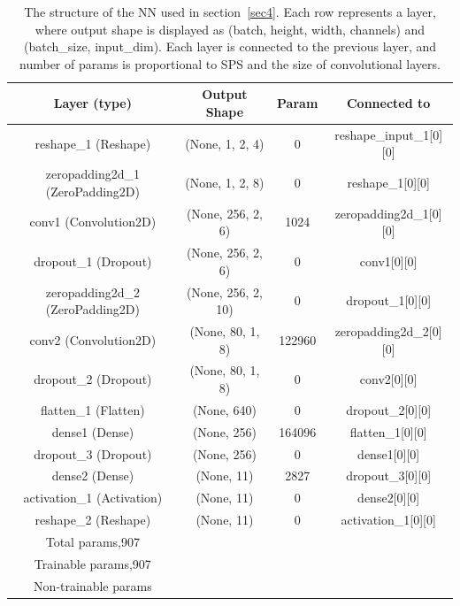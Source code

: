 \begin{table}[t!]
\centering
\caption{The structure of the NN used in section~\ref{sec4}. Each row represents a layer, where output shape is displayed as (batch, height, width, channels) and (batch\_size, input\_dim). Each layer is connected to the previous layer, and number of params is proportional to SPS and the size of convolutional layers.}
\begin{tabular}{c  c  c  c }
\toprule
Layer (type) & Output Shape & Param & Connected to\\\hline\hline
reshape\_1 (Reshape) & (None, 1, 2, 4) & 0 & reshape\_input\_1[0][0]\\
zeropadding2d\_1 (ZeroPadding2D) & (None, 1, 2, 8)    & 0       &    reshape\_1[0][0]\\
conv1 (Convolution2D)          &  (None, 256, 2, 6)  & 1024     &   zeropadding2d\_1[0][0]\\            
dropout\_1 (Dropout)            &  (None, 256, 2, 6)  & 0         &  conv1[0][0]\\
zeropadding2d\_2 (ZeroPadding2D) & (None, 256, 2, 10)  & 0          & dropout\_1[0][0]\\                 
conv2 (Convolution2D)          &  (None, 80, 1, 8)   & 122960     & zeropadding2d\_2[0][0]\\          
dropout\_2 (Dropout)           &   (None, 80, 1, 8)  &  0          & conv2[0][0]\\                  
flatten\_1 (Flatten)           &   (None, 640)      &   0          & dropout\_2[0][0]\\                 
dense1 (Dense)               &    (None, 256)       &    164096    & flatten\_1[0][0]\\                
dropout\_3 (Dropout)          &    (None, 256)      &     0          & dense1[0][0]\\                  
dense2 (Dense)               &    (None, 11)      &      2827       & dropout\_3[0][0]\\              
activation\_1 (Activation)   &     (None, 11)     &       0          & dense2[0][0]\\                 
reshape\_2 (Reshape)        &      (None, 11)    &        0    &       activation\_1[0][0]\\\hline\hline
Total params\: 290,907\\
Trainable params\: 290,907\\
Non-trainable params\: 0\\
\hline
\bottomrule
\end{tabular}
\label{table:tab1}
\end{table}

